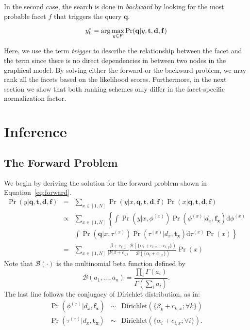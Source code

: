 In the second case, the search is done in \emph{backward} by looking for the
most probable facet $f$ that triggers the query $\mathbf{q}$.

\begin{equation}y^*_{\rm b} = \arg\max_{y \in F} \Pr(\mathbf{q}|y, \mathbf{t},
\mathbf{d}, \mathbf{f}) \label{eq:backward} \end{equation}

Here, we use the term \emph{trigger} to describe the relationship between the
facet and the term since there is no direct dependencies in between two nodes
in the graphical model.  By solving either the forward or the backward problem,
we may rank all the facets based on the likelihood scores.  Furthermore, in the
next section we show that both ranking schemes only differ in the
facet-specific normalization factor.

\section{Inference}

\subsection{The Forward Problem}
We begin by deriving the solution for the forward problem shown in
Equation~\eqref{eq:forward}. 
\begin{eqnarray}
  \Pr(y|\mathbf{q}, \mathbf{t}, \mathbf{d}, \mathbf{f}) 
  &=& \sum_{x \in [1, N]} \Pr(y|x, \mathbf{q}, \mathbf{t}, \mathbf{d}, \mathbf{f}) \Pr(x|\mathbf{q}, \mathbf{t}, \mathbf{d}, \mathbf{f}) \nonumber\\
  &\propto& \sum_{x \in [1, N]} \left\{ \int \Pr(y|x, \phi^{(x)}) \Pr(\phi^{(x)}|d_x, \mathbf{f_x}) \mathrm{d}\phi^{(x)} \right. \nonumber\\
  && \left. \int \Pr(\mathbf{q}| x, \tau^{(x)}) \Pr(\tau^{(x)}|d_x, \mathbf{t_x})\mathrm{d}\tau^{(x)} \Pr(x) \right\} \nonumber\\
  &=& \sum_{x \in [1, N]} \frac{\beta + c_{k,x}}{|F|\beta + c_{\cdot,x}} \frac{\mathcal{B}(\{\alpha_i + c_{i,x} + c_{i,q} \})}{\mathcal{B}(\{\alpha_i + c_{i,x} \})} \Pr(x)
\end{eqnarray}
Note that $\mathcal{B}(\cdot)$ is the multinomial beta
function defined by \[\mathcal{B}(a_1, \ldots, a_n) = \frac{\prod_i
\Gamma(a_i)}{\Gamma(\sum_i a_i)}. \]
The last line follows the conjugacy of Dirichlet distribution, as in:
\begin{eqnarray*}
\Pr(\phi^{(x)}|d_x,\mathbf{f_x}) &\sim& \mathrm{Dirichlet}(\{\beta_k + c_{k,x}; \forall k \}) \\
\Pr(\tau^{(x)}|d_x, \mathbf{t_x}) &\sim& \mathrm{Dirichlet}(\{\alpha_i + c_{i,x}; \forall i \}).
\end{eqnarray*}

